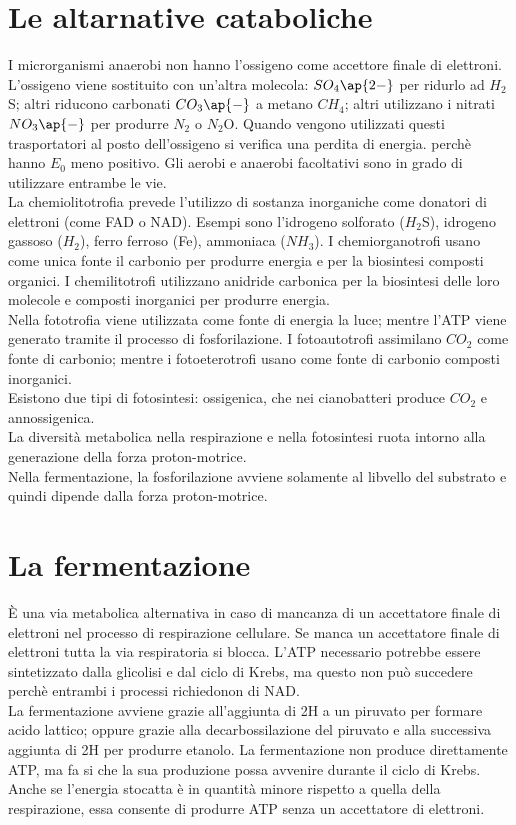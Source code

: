 \section{Le altarnative cataboliche}
I microrganismi anaerobi non hanno l'ossigeno come accettore finale di elettroni. L'ossigeno viene sostituito con un'altra molecola: $SO_4\ap{2-}$ per ridurlo ad $H_2$S; altri riducono carbonati $CO_3\ap{-}$ a metano $CH_4$; altri utilizzano i nitrati $NO_3\ap{-}$ per produrre $N_2$ o $N_2$O. Quando vengono utilizzati questi trasportatori al posto dell'ossigeno si verifica una perdita di energia. perch\`e hanno $E_0$ meno positivo. Gli aerobi e anaerobi facoltativi sono in grado di utilizzare entrambe le vie.
\\La chemiolitotrofia prevede l'utilizzo di sostanza inorganiche come donatori di elettroni (come FAD o NAD). Esempi sono l'idrogeno solforato ($H_2$S), idrogeno gassoso ($H_2$), ferro ferroso (Fe), ammoniaca ($NH_3$). I chemiorganotrofi usano come unica fonte il carbonio per produrre energia e per la biosintesi composti organici. I chemilitotrofi utilizzano anidride carbonica per la biosintesi delle loro molecole e composti inorganici per produrre energia. 
\\Nella fototrofia viene utilizzata come fonte di energia la luce; mentre l'ATP viene generato tramite il processo di fosforilazione. I fotoautotrofi assimilano $CO_2$ come fonte di carbonio; mentre i fotoeterotrofi usano come fonte di carbonio composti inorganici. 
\\Esistono due tipi di fotosintesi: ossigenica, che nei cianobatteri produce $CO_2$ e annossigenica.
\\La diversit\`a metabolica nella respirazione e nella fotosintesi ruota intorno alla generazione della forza proton-motrice. 
\\Nella fermentazione, la fosforilazione avviene solamente al libvello del substrato e quindi dipende dalla forza proton-motrice.
\section{La fermentazione}
\`E una via metabolica alternativa in caso di mancanza di un accettatore finale di elettroni nel processo di respirazione cellulare. Se manca un accettatore finale di elettroni tutta la via respiratoria si blocca. L'ATP necessario potrebbe essere sintetizzato dalla glicolisi e dal ciclo di Krebs, ma questo non pu\`o succedere perch\`e entrambi i processi richiedonon di NAD\ap{+}. 
\\La fermentazione avviene grazie all'aggiunta di 2H a un piruvato per formare acido lattico; oppure grazie alla decarbossilazione del piruvato e alla successiva aggiunta di 2H per produrre etanolo. La fermentazione non produce direttamente ATP, ma fa si che la sua produzione possa avvenire durante il ciclo di Krebs. Anche se l'energia stocatta \`e in quantit\`a minore rispetto a quella della respirazione, essa consente di produrre ATP senza un accettatore di elettroni. 
